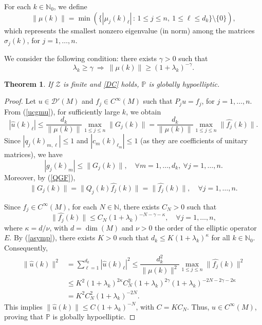 \documentclass{amsart}
\newtheorem{theorem}{Theorem}[section]
\theoremstyle{definition}
\theoremstyle{remark}
\numberwithin{equation}{section}
\begin{document}
	For each $k\in\mathbb{N}_0$, we define  
	\begin{equation*}
		\|\mu(k)\| = \min\left(\{|\mu_j(k)_\ell|\,:\, 1\leq j\leq n,\ 1\leq \ell\leq d_k\}\setminus\{0\}\right),
	\end{equation*}
	which represents the smallest nonzero eigenvalue (in norm) among the matrices $\sigma_j(k)$, for $j=1,\dots,n$. 
	
	We consider the following condition: there exists $\gamma>0$ such that  
	\begin{equation}\label{DC}
		\lambda_k\geq\gamma\ \Rightarrow\ \|\mu(k)\|\geq (1+\lambda_k)^{-\gamma}.
	\end{equation}
	
	\begin{theorem}\label{gh_system_normal}
		If $\mathcal{Z}$ is finite and \eqref{DC} holds, $\mathbb{P}$ is globally hypoelliptic.		
	\end{theorem}
	
	\begin{proof}
		Let $u\in\mathscr{D}'(M)$ and $f_j\in C^\infty(M)$ such that $P_ju=f_j$, for $j=1,\dots,n$. From (\ref{ucgmu}), for sufficiently large $k$, we obtain  
		\begin{equation*}
			|\widehat{u}(k)_\ell| \leq \dfrac{d_k}{\|\mu(k)\|}\max_{1\leq j\leq n}\|G_j(k)\| = \dfrac{d_k}{\|\mu(k)\|}\max_{1\leq j\leq n}\|\widehat{f_j}(k)\|.
		\end{equation*}
		Since $|q_j(k)_{m,\ell}|\leq 1$ and $|c_m(k)_{\ell_m}|\leq 1$ (as they are coefficients of unitary matrices), we have  
		\begin{equation*}
			|g_j(k)_m|\leq \|G_j(k)\|,\quad\forall m=1,\dots,d_k,\ \forall j=1,\dots,n.
		\end{equation*}
		Moreover, by (\ref{QGF}),  
		\begin{equation*}
			\|G_j(k)\|=\|Q_j(k)\widehat{f_j}(k)\|=\|\widehat{f_j}(k)\|,\quad \forall j=1,\dots,n.
		\end{equation*}
		
		Since $f_j\in C^\infty(M)$, for each $N\in\mathbb{N}$, there exists $C_N>0$ such that  
		\begin{equation*}
			\|\widehat{f_j}(k)\|\leq C_N(1+\lambda_k)^{-N-\gamma-\kappa},\quad\forall j=1,\dots,n,
		\end{equation*}
		where $\kappa=d/\nu$, with $d=\dim(M)$ and $\nu>0$ the order of the elliptic operator $E$. By (\ref{asymp}), there exists $K>0$ such that $d_k\leq K(1+\lambda_k)^{\kappa}$ for all $k\in\mathbb{N}_0$. Consequently,  
		\begin{align*}
			\|\widehat{u}(k)\|^2 & = \sum_{\ell=1}^{d_k}|\widehat{u}(k)_\ell|^2  
			\leq \dfrac{d_k^2}{\|\mu(k)\|^2}\max_{1\leq j\leq n}\|\widehat{f_j}(k)\|^2\\
			& \leq K^2(1+\lambda_k)^{2\kappa}C_N^2(1+\lambda_k)^{2\gamma}(1+\lambda_k)^{-2N-2\gamma-2\kappa}\\
			& = K^2C_N^2(1+\lambda_k)^{-2N}.
		\end{align*}
		This implies $\|\widehat{u}(k)\|\leq C(1+\lambda_k)^{-N}$, with $C=KC_N$. Thus, $u\in C^\infty(M)$, proving that $\mathbb{P}$ is globally hypoelliptic.	
	\end{proof}
	
\end{document}
